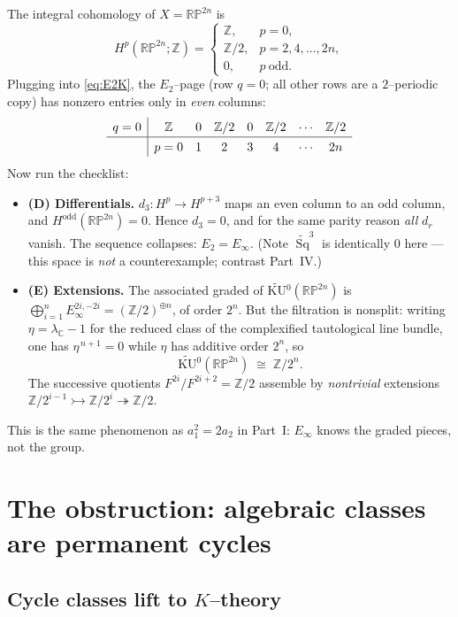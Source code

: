 \documentclass[11pt]{article}
\theoremstyle{definition}
\DeclareMathOperator{\Sq}{Sq}
\newcommand{\Z}{\mathbb{Z}}
\newcommand{\C}{\mathbb{C}}
\newcommand{\RP}{\mathbb{RP}}
\newcommand{\KU}{\mathrm{KU}}
\begin{document}
The integral cohomology of $X=\RP^{2n}$ is
\[
  H^{p}(\RP^{2n};\Z)=
  \begin{cases}\Z,& p=0,\\ \Z/2,& p=2,4,\dots,2n,\\ 0,& p\ \text{odd}.\end{cases}
\]
Plugging into \eqref{eq:E2K}, the $E_2$--page (row $q=0$; all other rows are a
$2$--periodic copy) has nonzero entries only in \emph{even} columns:
\[
\renewcommand{\arraystretch}{1.3}
\begin{array}{c|ccccccc}
 q=0 & \Z & 0 & \Z/2 & 0 & \Z/2 & \cdots & \Z/2\\ \hline
     & p=0 & 1 & 2 & 3 & 4 & \cdots & 2n
\end{array}
\]
Now run the checklist:
\begin{itemize}
\item \textbf{(D) Differentials.} $d_3\colon H^p\to H^{p+3}$ maps an even column
to an odd column, and $H^{\mathrm{odd}}(\RP^{2n})=0$. Hence $d_3=0$, and for the
same parity reason \emph{all} $d_r$ vanish. The sequence collapses:
$E_2=E_\infty$. (Note $\widetilde{\Sq}^3$ is identically $0$ here --- this space
is \emph{not} a counterexample; contrast Part~IV.)
\item \textbf{(E) Extensions.} The associated graded of
$\widetilde{\KU}{}^0(\RP^{2n})$ is $\bigoplus_{i=1}^{n}E_\infty^{2i,-2i}
=(\Z/2)^{\oplus n}$, of order $2^n$. But the filtration is nonsplit: writing
$\eta=\lambda_\C-1$ for the reduced class of the complexified tautological line
bundle, one has $\eta^{\,n+1}=0$ while $\eta$ has additive order $2^n$, so
\[
  \widetilde{\KU}{}^0(\RP^{2n})\;\cong\;\Z/2^n .
\]
The successive quotients $F^{2i}/F^{2i+2}=\Z/2$ assemble by \emph{nontrivial}
extensions $\Z/2^{i-1}\rightarrowtail \Z/2^{i}\twoheadrightarrow \Z/2$.
\end{itemize}
This is the same phenomenon as $a_1^2=2a_2$ in Part~I: $E_\infty$ knows the
graded pieces, not the group.

\section{The obstruction: algebraic classes are permanent cycles}

\subsection{Cycle classes lift to $K$--theory}
\end{document}
